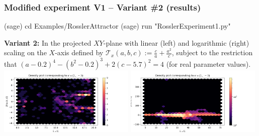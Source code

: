\documentclass[usenames,svgnames,dvipsnames,10pt]{beamer}
\begin{document}
\begin{frame}[fragile]
\frametitle{Modified experiment V1 -- Variant \#2 (results)}

\begin{center}
\begin{code}
(sage) cd Examples/RosslerAttractor
(sage) run "RosslerExperiment1.py"
\end{code}
\textbf{Variant 2:} 
In the projected $XY$-plane with linear (left) and logarithmic (right) scaling on the $X$-axis defined by 
$\mathcal{T}_x(a, b, c) := \frac{c}{a} + \frac{a^2}{c}$, subject to the restriction that 
$(a-0.2)^4-(b^2-0.2)^3+2 (c-5.7)^2 = 4$ (for real parameter values). \\ 
\includegraphics[width=0.49\textwidth]{../Images/RosslerAttractorExpt1-Variant2-linearscale-TypeXY-2021-10-27-025531.png}
\includegraphics[width=0.49\textwidth]{../Images/RosslerAttractorExpt1-Variant2-logscale-TypeXY-2021-10-27-025057.png}
\end{center}

\end{frame}
\end{document}
